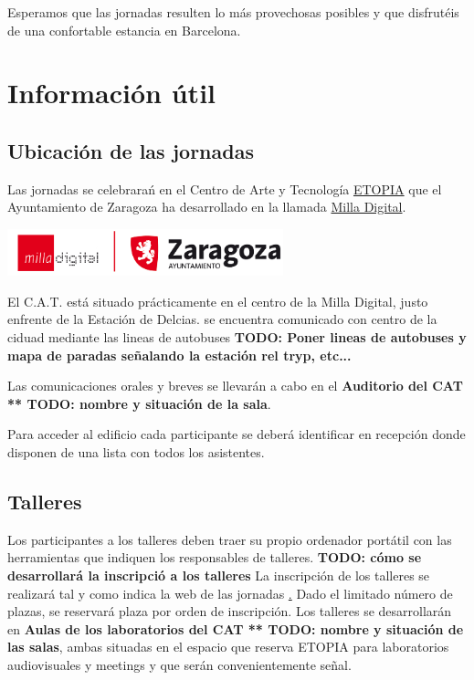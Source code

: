 Esperamos que las jornadas resulten lo más provechosas posibles y que
disfrutéis de una confortable estancia en Barcelona.


\chapter{Información útil}

\section{Ubicación de las jornadas}

Las jornadas se celebrarań en el Centro de Arte y Tecnología 
\href{http://www.zaragoza.es/ciudad/idezar/detalle_Centro?id=5105}{ETOPIA}
que  el Ayuntamiento de Zaragoza ha desarrollado en la llamada 
\href{http://www.milladigital.es/espanol/home.php}{Milla Digital}. 

\begin{center}
\includegraphics[width=0.6\textwidth]{Logos/logoMillaAyZgz.png}
\end{center}

El C.A.T. está situado prácticamente en el centro de la Milla Digital, 
justo enfrente de la Estación de Delcias.  se encuentra comunicado con centro de la ciduad mediante las lineas de autobuses
\textbf{TODO: Poner lineas de autobuses y mapa de paradas señalando
la estación rel tryp, etc...}

Las comunicaciones orales y breves se llevarán a cabo en el 
\textbf{Auditorio del CAT ** TODO: nombre y situación de la sala}. 

Para acceder al edificio cada participante se deberá identificar en
recepción donde disponen de una lista con todos los asistentes.


\section{Talleres}

Los participantes a los talleres deben traer su propio ordenador
portátil con las herramientas que indiquen los responsables de
talleres. \textbf{TODO: cómo se desarrollará la inscripció a los talleres}
La inscripción de los talleres se realizará tal y como
indica la web de las jornadas \href{http://r-es.org/V+Jornadas#Talleres}.
Dado el limitado número de plazas, se reservará plaza por
orden de inscripción. Los talleres se desarrollarán en 
\textbf{Aulas de los laboratorios del CAT ** TODO: nombre y situación de las salas}, ambas situadas en el
espacio que reserva ETOPIA para laboratorios audiovisuales y meetings
y que serán convenientemente señal. 


